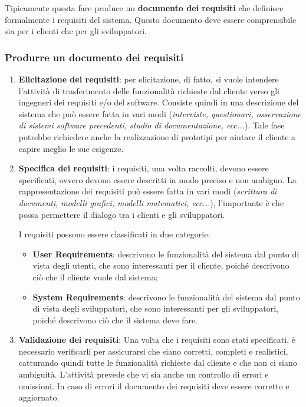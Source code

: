 Tipicamente questa fare produce un \textbf{documento dei requisiti} che definisce
formalmente i requisiti del sistema. Questo documento deve essere comprensibile sia
per i clienti che per gli sviluppatori.
\subsubsection{Produrre un documento dei requisiti}
\begin{enumerate}
    \item \textbf{Elicitazione dei requisiti}: per elicitazione, di fatto, si vuole intendere 
    l'attività di trasferimento delle funzionalità richieste dal cliente 
    verso gli ingegneri dei requisiti e/o del software. Consiste quindi in una descrizione 
    del sistema che può essere fatta in vari modi (\textit{interviste, questionari, osservazione 
    di sistemi software precedenti, studio di documentazione, ecc...}). Tale fase potrebbe 
    richiedere anche la realizzazione di prototipi per aiutare il cliente a capire meglio
    le sue esigenze.
    \item \textbf{Specifica dei requisiti}: i requisiti, una volta raccolti, devono essere
    specificati, ovvero devono essere descritti in modo preciso e non ambiguo. La rappresentazione
    dei requisiti può essere fatta in vari modi (\textit{scrittura di documenti,
    modelli grafici, modelli matematici, ecc...}), l'importante è che possa permettere
    il dialogo tra i clienti e gli sviluppatori.
    
    I requisiti possono essere classificati in due categorie:
    \begin{itemize}
        \item \textbf{User Requirements}: descrivono le funzionalità del sistema dal punto
        di vista degli utenti, che sono interessanti per il cliente, poiché descrivono
        ciò che il cliente vuole dal sistema;
        \item \textbf{System Requirements}: descrivono le funzionalità del sistema dal punto
        di vista degli sviluppatori, che sono interessanti per gli sviluppatori, poiché 
        descrivono ciò che il sistema deve fare.
    \end{itemize}
    \item \textbf{Validazione dei requisiti}: Una volta che i requisiti sono stati
    specificati, è necessario verificarli per assicurarsi che siano corretti, completi
    e realistici, 
    catturando quindi tutte le funzionalità richieste dal cliente e che non ci siano
    ambiguità. L'attività prevede che vi sia anche un controllo di errori e omissioni.
    In caso di errori il documento dei requisiti deve essere corretto e aggiornato.
\end{enumerate}
